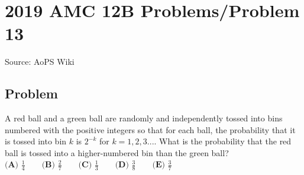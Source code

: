 \documentclass[12pt]{article}
\begin{document}
\section*{{2019 AMC 12B Problems/Problem 13}}
Source: AoPS Wiki

\subsection*{Problem}
A red ball and a green ball are randomly and independently tossed into bins numbered with the positive integers so that for each ball, the probability that it is tossed into bin $k$ is $2^{-k}$ for $k = 1,2,3....$ What is the probability that the red ball is tossed into a higher-numbered bin than the green ball? $\textbf{(A) } \frac{1}{4} \qquad\textbf{(B) } \frac{2}{7} \qquad\textbf{(C) } \frac{1}{3} \qquad\textbf{(D) } \frac{3}{8} \qquad\textbf{(E) } \frac{3}{7}$
\end{document}
